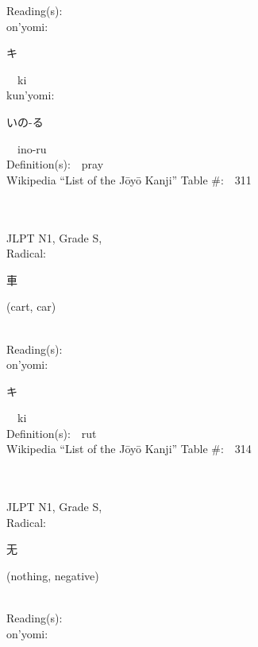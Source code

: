 \begin{multicols}{2}
Reading(s):\ \ \\
{\hspace*{1em}}on'yomi:\ \ \\
{\hspace*{2em}}{\begin{CJK}{UTF8}{min} キ \end{CJK}}\ \ ki\ \ \\
{\hspace*{1em}}kun'yomi:\ \ \\
{\hspace*{2em}}{\begin{CJK}{UTF8}{min} いの-る \end{CJK}}\ \ ino-ru\ \ \\
Definition(s):\ \ pray \\
Wikipedia ``List of the J\=oy\=o Kanji'' Table \#:\ \ 311 \\
\ \ \\
{\fontsize{34pt}{40pt}  }\ \ \\
{JLPT N1, Grade S, \\Radical:\ \ {\begin{CJK}{UTF8}{min} 車 \end{CJK}} (cart, car) } \\
Reading(s):\ \ \\
{\hspace*{1em}}on'yomi:\ \ \\
{\hspace*{2em}}{\begin{CJK}{UTF8}{min} キ \end{CJK}}\ \ ki\ \ \\
Definition(s):\ \ rut \\
Wikipedia ``List of the J\=oy\=o Kanji'' Table \#:\ \ 314 \\
\ \ \\
{\fontsize{34pt}{40pt}  }\ \ \\
{JLPT N1, Grade S, \\Radical:\ \ {\begin{CJK}{UTF8}{min} 无 \end{CJK}} (nothing, negative) } \\
Reading(s):\ \ \\
{\hspace*{1em}}on'yomi:\ \ \\

\end{multicols}
